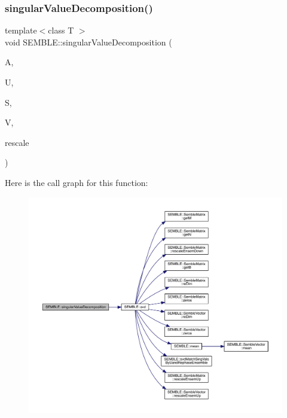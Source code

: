\subsubsection{\texorpdfstring{singularValueDecomposition()}{singularValueDecomposition()}\hspace{0.1cm}{\footnotesize\ttfamily [2/2]}}
{\footnotesize\ttfamily template$<$class T $>$ \\
void S\+E\+M\+B\+L\+E\+::singular\+Value\+Decomposition (\begin{DoxyParamCaption}\item[{const \mbox{\hyperlink{structSEMBLE_1_1SembleMatrix}{Semble\+Matrix}}$<$ T $>$ \&}]{A,  }\item[{\mbox{\hyperlink{structSEMBLE_1_1SembleMatrix}{Semble\+Matrix}}$<$ T $>$ \&}]{U,  }\item[{\mbox{\hyperlink{structSEMBLE_1_1SembleVector}{Semble\+Vector}}$<$ double $>$ \&}]{S,  }\item[{\mbox{\hyperlink{structSEMBLE_1_1SembleMatrix}{Semble\+Matrix}}$<$ T $>$ \&}]{V,  }\item[{bool}]{rescale }\end{DoxyParamCaption})}

Here is the call graph for this function\+:
\nopagebreak
\begin{figure}[H]
\begin{center}
\leavevmode
\includegraphics[width=350pt]{d7/dfd/namespaceSEMBLE_ab1fb9dc27b7697519b6ae677ce6cc545_cgraph}
\end{center}
\end{figure}
\mbox{\label{namespaceSEMBLE_adc86a1c9bd57aeb64bdc1ff2aebe41c4}} 
